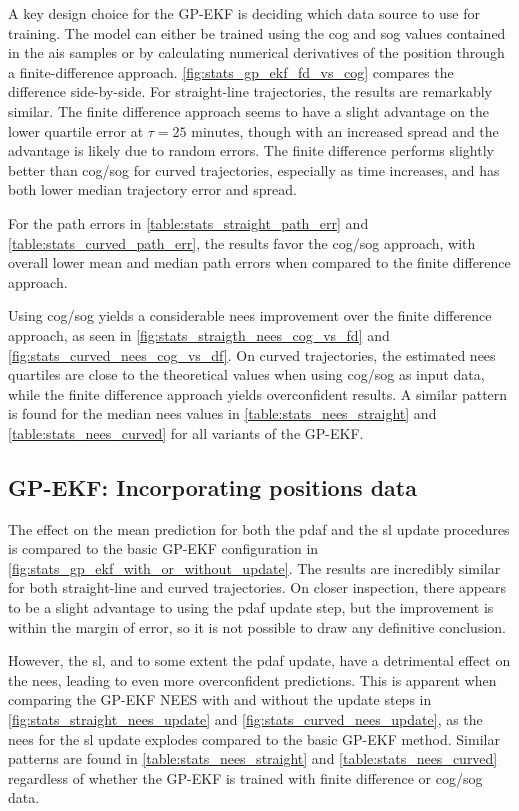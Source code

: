 A key design choice for the GP-EKF is deciding which data source to use for training. The model can either be trained using the \acrshort{cog} and \acrshort{sog} values contained in the \acrshort{ais} samples or by calculating numerical derivatives of the position through a finite-difference approach. \cref{fig:stats_gp_ekf_fd_vs_cog} compares the difference side-by-side. For straight-line trajectories, the results are remarkably similar. The finite difference approach seems to have a slight advantage on the lower quartile error at $\tau=25 \text{ minutes}$, though with an increased spread and the advantage is likely due to random errors. The finite difference performs slightly better than \acrshort{cog}/\acrshort{sog} for curved trajectories, especially as time increases, and has both lower median trajectory error and spread.

For the path errors in \cref{table:stats_straight_path_err} and \cref{table:stats_curved_path_err}, the results favor the \acrshort{cog}/\acrshort{sog} approach, with overall lower mean and median path errors when compared to the finite difference approach.

Using \acrshort{cog}/\acrshort{sog} yields a considerable \acrshort{nees} improvement over the finite difference approach, as seen in \cref{fig:stats_straigth_nees_cog_vs_fd} and \cref{fig:stats_curved_nees_cog_vs_df}. On curved trajectories, the estimated \acrshort{nees} quartiles are close to the theoretical values when using \acrshort{cog}/\acrshort{sog} as input data, while the finite difference approach yields overconfident results. A similar pattern is found for the median \acrshort{nees} values in \cref{table:stats_nees_straight} and \cref{table:stats_nees_curved} for all variants of the GP-EKF. 

\subsection{GP-EKF: Incorporating positions data}
The effect on the mean prediction for both the \acrshort{pdaf} and the \acrshort{sl} update procedures is compared to the basic GP-EKF configuration in \cref{fig:stats_gp_ekf_with_or_without_update}. The results are incredibly similar for both straight-line and curved trajectories. On closer inspection, there appears to be a slight advantage to using the \acrshort{pdaf} update step, but the improvement is within the margin of error, so it is not possible to draw any definitive conclusion.

However, the \acrshort{sl}, and to some extent the \acrshort{pdaf} update, have a detrimental effect on the \acrshort{nees}, leading to even more overconfident predictions. This is apparent when comparing the GP-EKF NEES with and without the update steps in \cref{fig:stats_straight_nees_update} and \cref{fig:stats_curved_nees_update}, as the \acrshort{nees} for the \acrshort{sl} update explodes compared to the basic GP-EKF method. Similar patterns are found in \cref{table:stats_nees_straight} and \cref{table:stats_nees_curved} regardless of whether the GP-EKF is trained with finite difference or \acrshort{cog}/\acrshort{sog} data.

